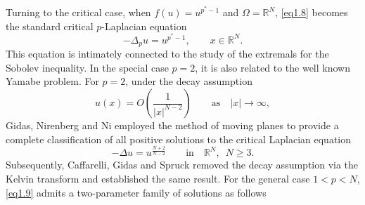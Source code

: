 \documentclass[12pt]{amsart}
\theoremstyle{definition}
\theoremstyle{remark}
\theoremstyle{conclusion}
\theoremstyle{conjecture}
\numberwithin{equation}{section}
\begin{document}
\smallskip
Turning to the critical case, when $f(u)=u^{p^*-1}$ and $\Omega=\mathbb{R}^N$, \eqref{eq1.8} becomes the standard critical $p$-Laplacian equation
\begin{equation}\label{eq1.9}
-\Delta_p u=u^{p^*-1}, \qquad x\in\mathbb{R}^N.
\end{equation}
This equation is intimately connected to the study of the extremals for the Sobolev inequality. In the special case $p=2$, it is also related to the well known Yamabe problem. For $p=2$, under the decay assumption
$$u(x)=O\left(\frac{1}{|x|^{N-2}}\right)\qquad\text{as}\quad|x|\rightarrow\infty, $$
Gidas, Nirenberg and Ni \cite{GNN} employed the method of moving planes to provide a complete classification of all positive solutions to the critical Laplacian equation
$$-\Delta u=u^{\frac{N+2}{N-2}}\qquad\text{in}\quad\mathbb{R}^N,\,\,\,N\geq3.$$
Subsequently, Caffarelli, Gidas and Spruck \cite{CGS2}  removed the decay assumption via the Kelvin transform and established the same result. For the general case $1<p<N$, \eqref{eq1.9} admits a two-parameter family of solutions as follows
\end{document}
